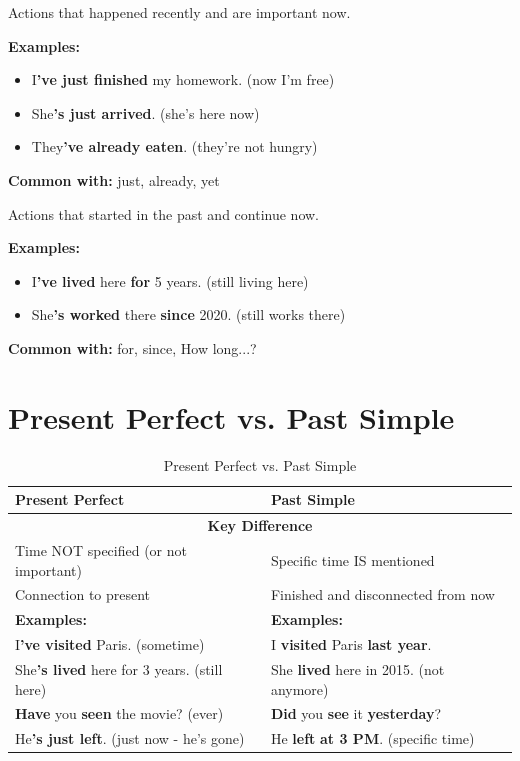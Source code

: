 \begin{grammarbox}[title=Use 2: Recent Actions with Relevance Now]
Actions that happened recently and are important now.

\textbf{Examples:}
\begin{itemize}
    \item I\textbf{'ve just finished} my homework.  (now I'm free)
    \item She\textbf{'s just arrived}.  (she's here now)
    \item They\textbf{'ve already eaten}.  (they're not hungry)
\end{itemize}

\textbf{Common with:} just, already, yet
\end{grammarbox}

\begin{grammarbox}[title=Use 3: Actions Continuing from Past to Present]
Actions that started in the past and continue now.

\textbf{Examples:}
\begin{itemize}
    \item I\textbf{'ve lived} here \textbf{for} 5 years.  (still living here)
    \item She\textbf{'s worked} there \textbf{since} 2020.  (still works there)
\end{itemize}

\textbf{Common with:} for, since, How long...?
\end{grammarbox}

\section{Present Perfect vs. Past Simple}

\begin{table}[h]
\centering
\begin{tabular}{|p{5.5cm}|p{5.5cm}|}
\hline
\textbf{Present Perfect} & \textbf{Past Simple} \\
\hline
\multicolumn{2}{|c|}{\textbf{Key Difference}} \\
\hline
Time NOT specified (or not important) & Specific time IS mentioned \\
\hline
Connection to present & Finished and disconnected from now \\
\hline
\textbf{Examples:} & \textbf{Examples:} \\
\hline
I\textbf{'ve visited} Paris. (sometime) & I \textbf{visited} Paris \textbf{last year}. \\
\hline
She\textbf{'s lived} here for 3 years. (still here) & She \textbf{lived} here in 2015. (not anymore) \\
\hline
\textbf{Have} you \textbf{seen} the movie? (ever) & \textbf{Did} you \textbf{see} it \textbf{yesterday}? \\
\hline
He\textbf{'s just left}. (just now - he's gone) & He \textbf{left} \textbf{at 3 PM}. (specific time) \\
\hline
\end{tabular}
\caption{Present Perfect vs. Past Simple}
\end{table}

